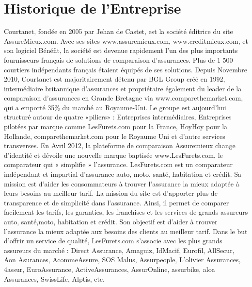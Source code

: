 \section{Historique de l'Entreprise}
Courtanet, fondée en 2005 par Jehan de Castet, est la société éditrice du site AssureMieux.com. Avec ses sites www.assuremieux.com, www.creditmieux.com, et son logiciel Bénéfit, la société est devenue rapidement l’un des plus importants fournisseurs français de solutions de comparaison d’assurances. Plus de 1 500 courtiers indépendants français étaient équipés de ses solutions. Depuis Novembre 2010, Courtanet est majoritairement détenu par BGL Group créé en 1992, intermédiaire britannique d’assurances et propriétaire également du leader de la comparaison d’assurances en Grande Bretagne via www.comparethemarket.com, qui a emporté 35\% du marché au Royaume-Uni. Le groupe est aujourd’hui structuré autour de quatre «piliers» : Entreprises intermédiaires, Entreprises pilotées par marque comme LesFurets.com pour la France, HoyHoy pour la Hollande, comparethemarket.com pour le Royaume Uni et d'autre services transverses. En Avril 2012, la plateforme de comparaison Assuremieux change d’identité et dévoile une nouvelle marque baptisée www.LesFurets.com, le comparateur qui « simplifie » l’assurance. LesFurets.com est un comparateur indépendant et impartial d’assurance auto, moto, santé, habitation et crédit. Sa mission est d’aider les consommateurs à trouver l’assurance la mieux adaptée à leurs besoins au meilleur tarif. La mission du site est d’apporter plus de transparence et de simplicité dans l’assurance. Ainsi, il permet de comparer facilement les tarifs, les garanties, les franchises et les services de grands assureurs auto, santé,moto, habitation et crédit. Son objectif est d’aider à trouver l’assurance la mieux adaptée aux besoins des clients au meilleur tarif. Dans le but d’offrir un service de qualité, LesFurets.com s’associe avec les plus grands assureurs du marché : Direct Assurance, Amaguiz, IdMacif, Eurofil, AllSecur, Aon Asurances, AcommeAssure, SOS Malus, Assurpeople, L’olivier Assurances, 4assur, EuroAssurance, ActiveAssurances, AssurOnline, assurbike, aloa Assurances, SwissLife, Alptis, etc.
